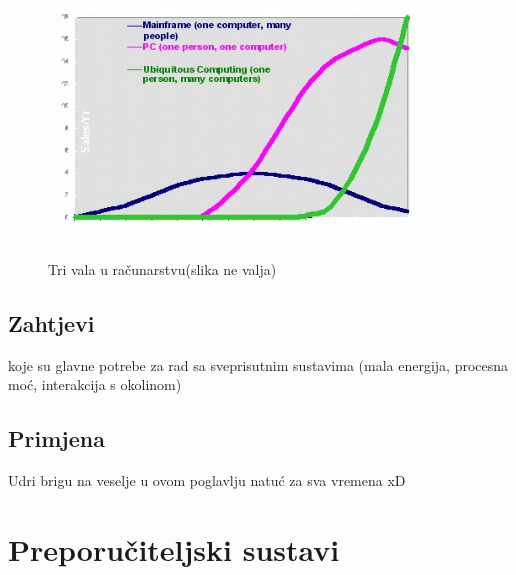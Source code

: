 \documentclass[times, utf8, diplomski, numeric]{fer}
\begin{document}
\begin{figure}[htb]
	\centering
	\includegraphics[width=10cm]{images/majortrends.png}
	\caption{Tri vala u računarstvu(slika ne valja)}
	\label{fig:majortrends}
\end{figure}

\section{Zahtjevi}


koje su glavne potrebe za rad sa sveprisutnim sustavima (mala energija,
procesna moć, interakcija s okolinom)

\section{Primjena}

Udri brigu na veselje u ovom poglavlju natuć za sva vremena xD

\chapter{Preporučiteljski sustavi}
\end{document}
